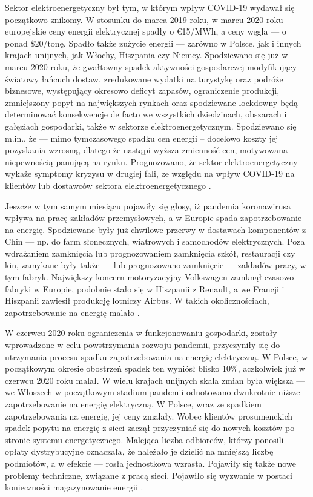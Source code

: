 \documentclass[polish, twoside, 12pt, a4paper]{article}
\theoremstyle{definition}
\theoremstyle{plain}
\theoremstyle{remark}
\begin{document}
Sektor elektroenergetyczny był tym, w którym wpływ COVID-19 wydawał się początkowo znikomy. W stosunku do marca 2019 roku, w marcu 2020 roku europejskie ceny energii elektrycznej spadły o €15/MWh, a ceny węgla --- o ponad \$20/tonę. Spadło także zużycie energii --- zarówno w Polsce, jak i innych krajach unijnych, jak Włochy, Hiszpania czy Niemcy. Spodziewano się już w marcu 2020 roku, że gwałtowny spadek aktywności gospodarczej modyfikujący światowy łańcuch dostaw, zredukowane wydatki na turystykę oraz podróże biznesowe, występujący okresowo deficyt zapasów, ograniczenie produkcji, zmniejszony popyt na największych rynkach oraz spodziewane lockdowny będą determinować konsekwencje de facto we wszystkich dziedzinach, obszarach i gałęziach gospodarki, także w sektorze elektroenergetycznym. Spodziewano się m.in., że --- mimo tymczasowego spadku cen energii – docelowo koszty jej pozyskania wzrosną, dlatego że nastąpi wyższa zmienność cen, motywowana niepewnością panującą na rynku. Prognozowano, że sektor elektroenergetyczny wykaże symptomy kryzysu w drugiej fali, ze względu na wpływ COVID-19 na klientów lub dostawców sektora elektroenergetycznego \parencite{wajer2023}. 

Jeszcze w tym samym miesiącu pojawiły się głosy, iż pandemia koronawirusa wpływa na pracę zakładów przemysłowych, a w Europie spada zapotrzebowanie na energię. Spodziewane były już chwilowe przerwy w dostawach komponentów z Chin --- np. do farm słonecznych, wiatrowych i samochodów elektrycznych. Poza wdrażaniem zamknięcia lub prognozowaniem zamknięcia szkół, restauracji czy kin, zamykane były także --- lub prognozowano zamknięcie --- zakładów pracy, w tym fabryk. Największy koncern motoryzacyjny Volkswagen zamknął czasowo fabryki w Europie, podobnie stało się w Hiszpanii z Renault, a we Francji i Hiszpanii zawiesił produkcję lotniczy Airbus. W takich okolicznościach, zapotrzebowanie na energię malało \parencite{wysokienapiecie2023}. 

W czerwcu 2020 roku ograniczenia w funkcjonowaniu gospodarki, zostały wprowadzone w celu powstrzymania rozwoju pandemii, przyczyniły się do utrzymania procesu spadku zapotrzebowania na energię elektryczną. W Polsce, w początkowym okresie obostrzeń spadek ten wyniósł blisko 10\%, aczkolwiek już w czerwcu 2020 roku malał. W wielu krajach unijnych skala zmian była większa --- we Włoszech w początkowym stadium pandemii odnotowano dwukrotnie niższe zapotrzebowanie na energię elektryczną. W Polsce, wraz ze spadkiem zapotrzebowania na energię, jej ceny zmalały. Wobec klientów prosumenckich spadek popytu na energię z sieci zaczął przyczyniać się do nowych kosztów po stronie systemu energetycznego. Malejąca liczba odbiorców, którzy ponosili opłaty dystrybucyjne oznaczała, że należało je dzielić na mniejszą liczbę podmiotów, a w efekcie --- rosła jednostkowa wzrasta. Pojawiły się także nowe problemy techniczne, związane z pracą sieci. Pojawiło się wyzwanie w postaci konieczności magazynowanie energii \parencite{ure2023}.
\end{document}
